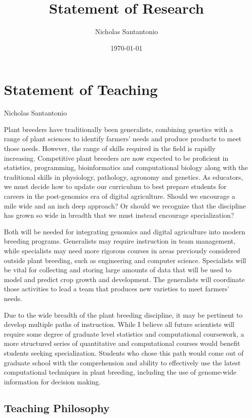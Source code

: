 \documentclass[11pt]{article}
\title{Statement of Research}
\author{Nicholas Santantonio}
\date{\today}
\begin{document}
\section*{\centering Statement of Teaching}
\begin{center} Nicholas Santantonio \end{center}

\noindent Plant breeders have traditionally been generalists, combining genetics with a range of plant sciences to identify farmers' needs and produce products to meet those needs. However, the range of skills required in the field is rapidly increasing. Competitive plant breeders are now expected to be proficient in statistics, programming, bioinformatics and computational biology along with the traditional skills in physiology, pathology, agronomy and genetics. As educators, we must decide how to update our curriculum to best prepare students for careers in the post-genomics era of digital agriculture. Should we encourage a mile wide and an inch deep approach? Or should we recognize that the discipline has grown so wide in breadth that we must instead encourage specialization? 

Both will be needed for integrating genomics and digital agriculture into modern breeding programs. Generalists may require instruction in team management, while specialists may need more rigorous courses in areas previously considered outside plant breeding, such as engineering and computer science. Specialists will be vital for collecting and storing large amounts of data that will be used to model and predict crop growth and development. The generalists will coordinate those activities to lead a team that produces new varieties to meet farmers' needs.

Due to the wide breadth of the plant breeding discipline, it may be pertinent to develop multiple paths of instruction. While I believe all future scientists will require some degree of graduate level statistics and computational coursework, a more structured series of quantitative and computational courses would benefit students seeking specialization. Students who chose this path would come out of graduate school with the comprehension and ability to effectively use the latest computational techniques in plant breeding, including the use of genome-wide information for decision making.




\subsection*{Teaching Philosophy}
\end{document}
